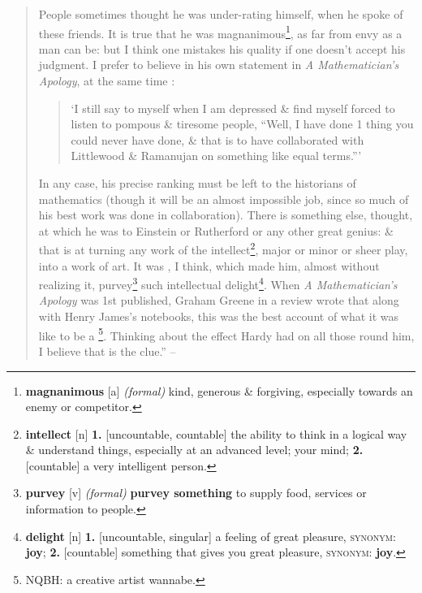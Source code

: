 \documentclass[oneside]{book}
\numberwithin{equation}{section}
\begin{document}
\begin{quotation}
	People sometimes thought he was under-rating himself, when he spoke of these friends. It is true that he was magnanimous\footnote{\textbf{magnanimous} [a] \textit{(formal)} kind, generous \& forgiving, especially towards an enemy or competitor.}, as far from envy as a man can be: but I think one mistakes his quality if one doesn't accept his judgment. I prefer to believe in his own statement in \textit{A Mathematician's Apology}, at the same time :
	\begin{quotation}
		`I still say to myself when I am depressed \& find myself forced to listen to pompous \& tiresome people, ``Well, I have done 1 thing you could never have done, \& that is to have collaborated with Littlewood \& Ramanujan on something like equal terms.'''
	\end{quotation}
	In any case, his precise ranking must be left to the historians of mathematics (though it will be an almost impossible job, since so much of his best work was done in collaboration). There is something else, thought, at which he was  to Einstein or Rutherford or any other great genius: \& that is at turning any work of the intellect\footnote{\textbf{intellect} [n] \textbf{1.} [uncountable, countable] the ability to think in a logical way \& understand things, especially at an advanced level; your mind; \textbf{2.} [countable] a very intelligent person.}, major or minor or sheer play, into a work of art. It was , I think, which made him, almost without realizing it, purvey\footnote{\textbf{purvey} [v] \textit{(formal)} \textbf{purvey something} to supply food, services or information to people.} such intellectual delight\footnote{\textbf{delight} [n] \textbf{1.} [uncountable, singular] a feeling of great pleasure, \textsc{synonym}: \textbf{joy}; \textbf{2.} [countable] something that gives you great pleasure, \textsc{synonym}: \textbf{joy}.}. When \textit{A Mathematician's Apology} was 1st published, Graham Greene in a review wrote that along with Henry James's notebooks, this was the best account of what it was like to be a \footnote{NQBH: a creative artist wannabe.}. Thinking about the effect Hardy had on all those round him, I believe that is the clue.'' -- \cite[Foreword, pp. 12--13]{Hardy1992}
\end{quotation}


\end{document}

